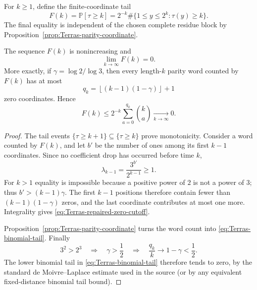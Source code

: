 For \(k\ge1\), define the finite-coordinate tail
\begin{equation}
\label{eq:Terras-Fk}
 F(k)=\mathbb P[\tau\ge k]
 =2^{-k}\#\{1\le y\le2^k:\tau(y)\ge k\}.
\end{equation}
The final equality is independent of the chosen complete residue block by
Proposition~\ref{prop:Terras-parity-coordinate}.

\begin{theorem}
\label{thm:Terras-1976-coefficient-tail}
The sequence \(F(k)\) is nonincreasing and
\[
 \lim_{k\to\infty}F(k)=0.
\]
More exactly, if
\(\gamma=\log 2/\log 3\), then every length-\(k\) parity word counted by
\(F(k)\) has at most
\begin{equation}
\label{eq:Terras-repaired-zero-cutoff}
 q_k=\left\lfloor (k-1)(1-\gamma)\right\rfloor+1
\end{equation}
zero coordinates.  Hence
\begin{equation}
\label{eq:Terras-binomial-tail}
 F(k)\le 2^{-k}\sum_{a=0}^{q_k}\binom{k}{a}
 \xrightarrow[k\to\infty]{}0.
\end{equation}
\end{theorem}

\begin{proof}
The tail events \(\{\tau\ge k+1\}\subseteq\{\tau\ge k\}\) prove
monotonicity.  Consider a word counted by \(F(k)\), and let \(b'\) be the
number of ones among its first \(k-1\) coordinates.  Since no coefficient
drop has occurred before time \(k\),
\[
 \lambda_{k-1}=\frac{3^{b'}}{2^{k-1}}\ge1.
\]
For \(k>1\) equality is impossible because a positive power of \(2\) is not
a power of \(3\); thus \(b'>(k-1)\gamma\).  The first \(k-1\) positions
therefore contain fewer than \((k-1)(1-\gamma)\) zeros, and the last
coordinate contributes at most one more.  Integrality gives
\eqref{eq:Terras-repaired-zero-cutoff}.

Proposition~\ref{prop:Terras-parity-coordinate} turns the word count into
\eqref{eq:Terras-binomial-tail}.  Finally
\[
 3^2>2^3\quad\Longrightarrow\quad
 \gamma>\frac12
 \quad\Longrightarrow\quad
 \frac{q_k}{k}\longrightarrow1-\gamma<\frac12.
\]
The lower binomial tail in \eqref{eq:Terras-binomial-tail} therefore tends
to zero, by the standard de Moivre--Laplace estimate used in the source (or
by any equivalent fixed-distance binomial tail bound).
\end{proof}

